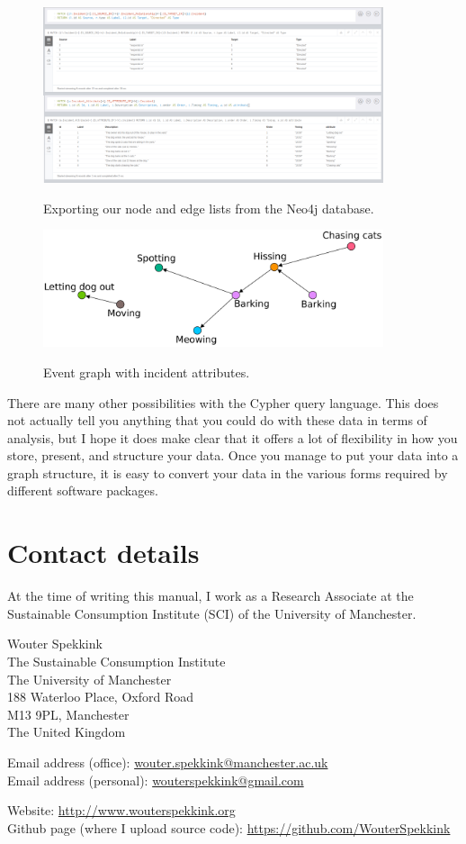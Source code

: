 \documentclass{memoir}
\begin{document}
\begin{figure}[h!]
  \centering
  \caption{Exporting our node and edge lists from the Neo4j database.}
  \includegraphics[width=100mm]{Screenshot_20.pdf}
  \label{fig:exportingneo4j}
\end{figure}

\begin{figure}[h!]
  \centering
  \caption{Event graph with incident attributes.}
  \includegraphics[width=100mm]{Diagram_5.pdf}
  \label{fig:eventgraphtwo}
\end{figure}

There are many other possibilities with the Cypher query language. This does not actually tell you anything that you could do with these data in terms of analysis, but I hope it does make clear that it offers a lot of flexibility in how you store, present, and structure your data. Once you manage to put your data into a graph structure, it is easy to convert your data in the various forms required by different software packages.

\chapter{Contact details}
\label{chap:contactdetails}

At the time of writing this manual, I work as a Research Associate at the Sustainable Consumption Institute (SCI) of the University of Manchester.

Wouter Spekkink \\
The Sustainable Consumption Institute \\
The University of Manchester \\
188 Waterloo Place, Oxford Road \\
M13 9PL, Manchester \\
The United Kingdom

Email address (office): \href{mailto:wouter.spekkink@manchester.ac.uk}{wouter.spekkink@manchester.ac.uk} \\
Email address (personal): \href{mailto:wouterspekkink@gmail.com}{wouterspekkink@gmail.com}

Website: \url{http://www.wouterspekkink.org} \\
Github page (where I upload source code): \url{https://github.com/WouterSpekkink}
\end{document}
